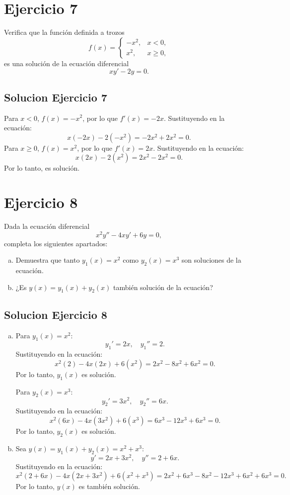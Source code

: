 \documentclass[12pt]{article}
\begin{document}
\section*{Ejercicio 7}

Verifica que la función definida a trozos
\[
f(x) =
\begin{cases}
- x^2, & x < 0, \\
x^2, & x \ge 0,
\end{cases}
\]
es una solución de la ecuación diferencial
\[
x y' - 2y = 0.
\]

\subsection*{Solucion Ejercicio 7}

Para $\boxed{x < 0}$, $f(x) = -x^2$, por lo que $f'(x) = -2x$. Sustituyendo en la ecuación:
\[
x(-2x) - 2(-x^2) = -2x^2 + 2x^2 = 0.
\]
Para $\boxed{x \geq 0}$, $f(x) = x^2$, por lo que $f'(x) = 2x$. Sustituyendo en la ecuación:
\[
x(2x) - 2(x^2) = 2x^2 - 2x^2 = 0.
\]
Por lo tanto, es solución.

\section*{Ejercicio 8}

Dada la ecuación diferencial
\[
x^2 y'' - 4x y' + 6y = 0,
\]
completa los siguientes apartados:

\begin{enumerate}[a)]
\item Demuestra que tanto $y_1(x) = x^2$ como $y_2(x) = x^3$ son soluciones de la ecuación.
\item ¿Es $y(x) = y_1(x) + y_2(x)$ también solución de la ecuación?
\end{enumerate}

\subsection*{Solucion Ejercicio 8}
\begin{enumerate}[a)]
\item Para $y_1(x) = x^2$:
\[y_1' = 2x, \quad y_1'' = 2. \]
Sustituyendo en la ecuación:
\[x^2(2) - 4x(2x) + 6(x^2) = 2x^2 - 8x^2 + 6x^2 = 0.\]
Por lo tanto, $y_1(x)$ es solución.

Para $y_2(x) = x^3$:
\[y_2' = 3x^2, \quad y_2'' = 6x. \]
Sustituyendo en la ecuación:
\[x^2(6x) - 4x(3x^2) + 6(x^3) = 6x^3 - 12x^3 + 6x^3 = 0.\]
Por lo tanto, $y_2(x)$ es solución.
\item Sea $y(x) = y_1(x) + y_2(x) = x^2 + x^3$:
\[y' = 2x + 3x^2, \quad y'' = 2 + 6x. \]
Sustituyendo en la ecuación:
\[x^2(2 + 6x) - 4x(2x + 3x^2) + 6(x^2 + x^3) = 2x^2 + 6x^3 - 8x^2 - 12x^3 + 6x^2 + 6x^3 = 0.\]
Por lo tanto, $y(x)$ es también solución.
\end{enumerate}
\end{document}
